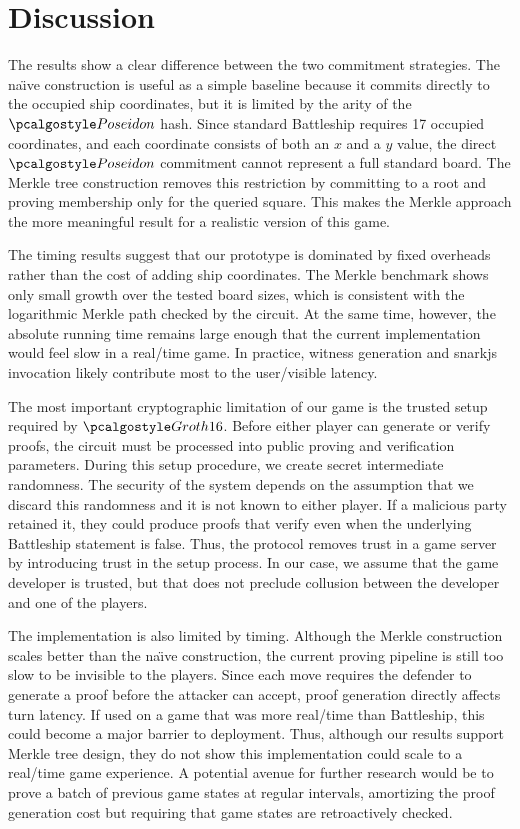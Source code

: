 \section{Discussion}
\label{sec:discussion}

The results show a clear difference between the two commitment strategies. The na{\"\i}ve construction is useful as a simple baseline because it commits directly to the occupied ship coordinates, but it is limited by the arity of the $\poseidon$ hash. Since standard Battleship requires 17 occupied coordinates, and each coordinate consists of both an $x$ and a $y$ value, the direct $\poseidon$ commitment cannot represent a full standard board. The Merkle tree construction removes this restriction by committing to a root and proving membership only for the queried square. This makes the Merkle approach the more meaningful result for a realistic version of this game.

The timing results suggest that our prototype is dominated by fixed overheads rather than the cost of adding ship coordinates. The Merkle benchmark shows only small growth over the tested board sizes, which is consistent with the logarithmic Merkle path checked by the circuit. At the same time, however, the absolute running time remains large enough that the current implementation would feel slow in a real\-/time game. In practice, witness generation and snarkjs invocation likely contribute most to the user\-/visible latency. 

The most important cryptographic limitation of our game is the trusted setup required by $\groth$. Before either player can generate or verify proofs, the circuit must be processed into public proving and verification parameters. During this setup procedure, we create secret intermediate randomness. The security of the system depends on the assumption that we discard this randomness and it is not known to either player. If a malicious party retained it, they could produce proofs that verify even when the underlying Battleship statement is false. Thus, the protocol removes trust in a game server by introducing trust in the setup process. In our case, we assume that the game developer is trusted, but that does not preclude collusion between the developer and one of the players.

The implementation is also limited by timing. Although the Merkle construction scales better than the na{\"\i}ve construction, the current proving pipeline is still too slow to be invisible to the players. Since each move requires the defender to generate a proof before the attacker can accept, proof generation directly affects turn latency. If used on a game that was more real\-/time than Battleship, this could become a major barrier to deployment. Thus, although our results support Merkle tree design, they do not show this implementation could scale to a real\-/time game experience. A potential avenue for further research would be to prove a batch of previous game states at regular intervals, amortizing the proof generation cost but requiring that game states are retroactively checked.

